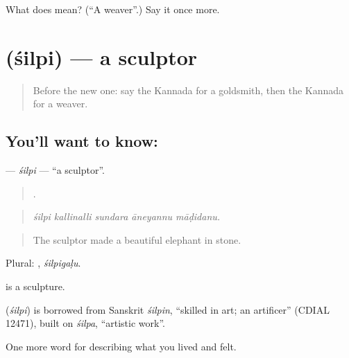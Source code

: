 \begin{tcolorbox}[breakable,colback=teal!4,colframe=teal!35!black,title={Before you move on}]
What does  mean? (\textquotedblleft{}A weaver\textquotedblright{}.) Say it once more.
\end{tcolorbox}
\section[\texorpdfstring{\kn{ಶಿಲ್ಪಿ} (śilpi)}{ಶಿಲ್ಪಿ (śilpi)}]{ (śilpi) — a sculptor}

\label{lesson:KA-C522-silpi}



\begin{quote}
Before the new one: say the Kannada for a goldsmith, then the Kannada for a weaver.
\end{quote}

\subsection*{You'll want to know: }
\textbf{} — \emph{śilpi} — \textquotedblleft{}a sculptor\textquotedblright{}.

\begin{quote}
    .
\end{quote}

\begin{quote}
\emph{śilpi kallinalli sundara āneyannu māḍidanu.}
\end{quote}

\begin{quote}
The sculptor made a beautiful elephant in stone.
\end{quote}

Plural: , \emph{śilpigaḷu}.

 is a sculpture.

\begin{cousinweb}
\textbf{} (\emph{śilpi}) is borrowed from Sanskrit \emph{śilpin}, \textquotedblleft{}skilled in art; an artificer\textquotedblright{} (CDIAL 12471), built on \emph{śilpa}, \textquotedblleft{}artistic work\textquotedblright{}.
\end{cousinweb}

\begin{grammarlens}[title={What you've built}]
One more word for describing what you lived and felt.
\end{grammarlens}

